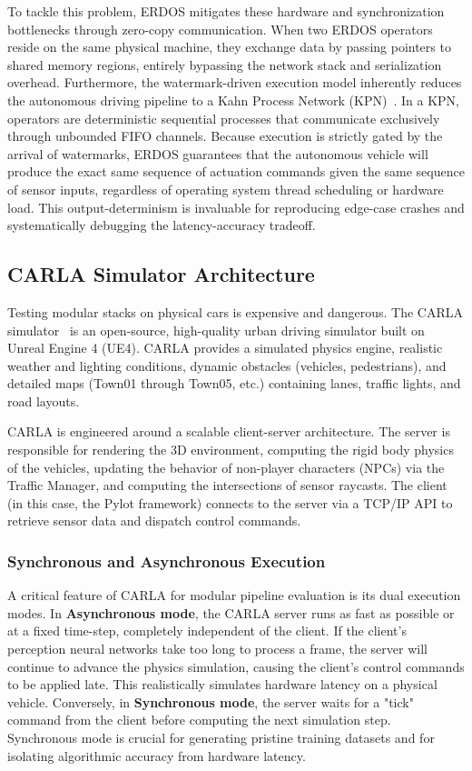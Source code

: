 \documentclass[11pt,a4paper]{report}
\begin{document}
To tackle this problem, ERDOS mitigates these hardware and synchronization bottlenecks through zero-copy communication. When two ERDOS operators reside on the same physical machine, they exchange data by passing pointers to shared memory regions, entirely bypassing the network stack and serialization overhead. Furthermore, the watermark-driven execution model inherently reduces the autonomous driving pipeline to a Kahn Process Network (KPN)~\cite{kahn_process}. In a KPN, operators are deterministic sequential processes that communicate exclusively through unbounded FIFO channels. Because execution is strictly gated by the arrival of watermarks, ERDOS guarantees that the autonomous vehicle will produce the exact same sequence of actuation commands given the same sequence of sensor inputs, regardless of operating system thread scheduling or hardware load. This output-determinism is invaluable for reproducing edge-case crashes and systematically debugging the latency-accuracy tradeoff.

\subsection{CARLA Simulator Architecture}
Testing modular stacks on physical cars is expensive and dangerous. The CARLA simulator~\cite{carla_sim} is an open-source, high-quality urban driving simulator built on Unreal Engine 4 (UE4). CARLA provides a simulated physics engine, realistic weather and lighting conditions, dynamic obstacles (vehicles, pedestrians), and detailed maps (Town01 through Town05, etc.) containing lanes, traffic lights, and road layouts. 

CARLA is engineered around a scalable client-server architecture. The server is responsible for rendering the 3D environment, computing the rigid body physics of the vehicles, updating the behavior of non-player characters (NPCs) via the Traffic Manager, and computing the intersections of sensor raycasts. The client (in this case, the Pylot framework) connects to the server via a TCP/IP API to retrieve sensor data and dispatch control commands. 

\subsubsection{Synchronous and Asynchronous Execution}
A critical feature of CARLA for modular pipeline evaluation is its dual execution modes. In \textbf{Asynchronous mode}, the CARLA server runs as fast as possible or at a fixed time-step, completely independent of the client. If the client's perception neural networks take too long to process a frame, the server will continue to advance the physics simulation, causing the client's control commands to be applied late. This realistically simulates hardware latency on a physical vehicle. Conversely, in \textbf{Synchronous mode}, the server waits for a "tick" command from the client before computing the next simulation step. Synchronous mode is crucial for generating pristine training datasets and for isolating algorithmic accuracy from hardware latency.
\end{document}
